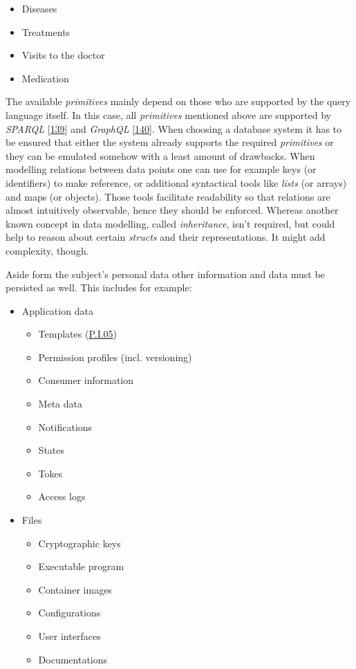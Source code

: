 \documentclass[12pt,english,a4paper,titlepage,cleardoublepage=empty,dottedtoc]{report}
\providecommand{\tightlist}{%
  \setlength{\itemsep}{0pt}\setlength{\parskip}{0pt}}
\begin{document}
\begin{itemize}
  \begin{itemize}
  \tightlist
  \item
    Diseases
  \item
    Treatments
  \item
    Visits to the doctor
  \item
    Medication
  \end{itemize}
\end{itemize}

The available \emph{primitives} mainly depend on those who are supported
by the query language itself. In this case, all \emph{primitives}
mentioned above are supported by \emph{SPARQL}
{[}\protect\hyperlink{ref-web_spec_xml_types}{139}{]} and \emph{GraphQL}
{[}\protect\hyperlink{ref-web_spec_graphql_types}{140}{]}. When choosing
a database system it has to be ensured that either the system already
supports the required \emph{primitives} or they can be emulated somehow
with a least amount of drawbacks. When modelling relations between data
points one can use for example keys (or identifiers) to make reference,
or additional syntactical tools like \emph{lists} (or arrays) and maps
(or objects). Those tools facilitate readability so that relations are
almost intuitively observable, hence they should be enforced. Whereas
another known concept in data modelling, called \emph{inheritance},
isn't required, but could help to reason about certain \emph{structs}
and their representations. It might add complexity, though.

Aside form the subject's personal data other information and data must
be persisted as well. This includes for example:

\begin{itemize}
\tightlist
\item
  Application data

  \begin{itemize}
  \tightlist
  \item
    Templates (\protect\hyperlink{pi05}{P.I.05})
  \item
    Permission profiles (incl. versioning)
  \item
    Consumer information
  \item
    Meta data
  \item
    Notifications
  \item
    States
  \item
    Tokes
  \item
    Access logs
  \end{itemize}
\item
  Files

  \begin{itemize}
  \tightlist
  \item
    Cryptographic keys
  \item
    Executable program
  \item
    Container images
  \item
    Configurations
  \item
    User interfaces
  \item
    Documentations
  \end{itemize}
\end{itemize}
\end{document}
